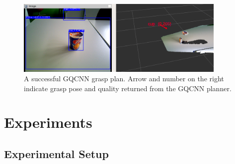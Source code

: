 \documentclass[runningheads]{../llncs}
\begin{document}
\begin{figure}[h!]
    \centering
    \includegraphics[width=0.9\textwidth]{grasp_gqcnn_result}
    \caption{A successful GQCNN grasp plan. Arrow and number on the right indicate grasp pose and quality returned from
             the GQCNN planner.}
    \label{fig:gqcnn_result}
\end{figure}

\section{Experiments} \label{section:experiments}

\subsection{Experimental Setup}
\end{document}
